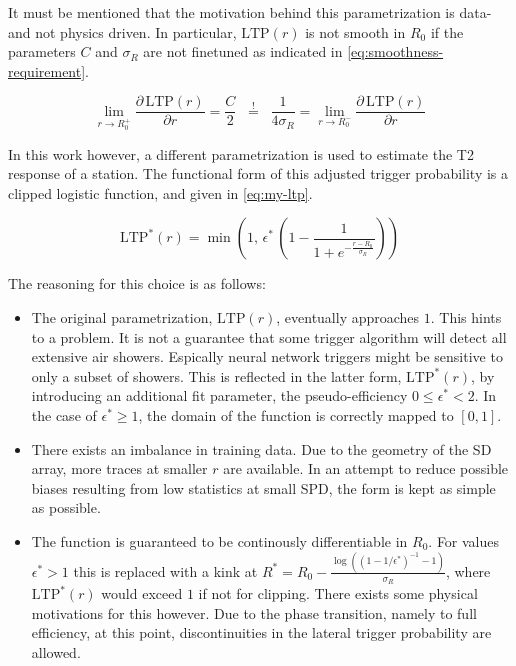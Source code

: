 It must be mentioned that the motivation behind this parametrization is data- and not physics driven. In particular, $\text{LTP}(r)$ is not smooth in $R_0$ if the 
parameters $C$ and $\sigma_R$ are not finetuned as indicated in \autoref{eq:smoothness-requirement}.

\begin{equation}
	\label{eq:smoothness-requirement}
	\lim\limits_{r \to R_0^+} \frac{\partial\,\text{LTP}(r)}{\partial r} = \frac{C}{2} \;\; \stackrel{!}{=} \;\; \frac{1}{4\sigma_R} = \lim\limits_{r \to R_0^-} \frac{\partial\,\text{LTP}(r)}{\partial r}
\end{equation}

In this work however, a different parametrization is used to estimate the T2 response of a station. The functional form of this adjusted trigger probability is
a clipped logistic function, and given in \autoref{eq:my-ltp}.

\begin{equation}
	\label{eq:my-ltp}
	\text{LTP}^*(r) = \min\left(1,\,\epsilon^*\,\left(1 - \frac{1}{1+e^{-\frac{r-R_0}{\sigma_R}}}\right)\right)
\end{equation}

The reasoning for this choice is as follows:

\begin{itemize}
	\item The original parametrization, $\text{LTP}(r)$, eventually approaches $1$. This hints to a problem. It is not a guarantee that some trigger algorithm will
	detect all extensive air showers. Espically neural network triggers  might be sensitive to only a subset of showers. This is reflected in the latter form, 
	$\text{LTP}^*(r)$, by introducing an additional fit parameter, the pseudo-efficiency $0\leq\epsilon^*<2$. In the case of $\epsilon^*\geq1$, the domain of the 
	function is correctly mapped to $[0, 1]$.

	\item There exists an imbalance in training data. Due to the geometry of the SD array, more traces at smaller $r$ are available. In an attempt to reduce 
	possible biases resulting from low statistics at small SPD, the form is kept as simple as possible.

	\item The function is guaranteed to be continously differentiable in $R_0$. For values $\epsilon^* > 1$ this is replaced with a kink at 
	$R^* = R_0 - \frac{\log\left(\left(1 - 1/\epsilon^*\right)^{-1}-1\right)}{\sigma_R}$, where $\text{LTP}^*(r)$ would exceed $1$ if not for clipping. There 
	exists some physical motivations for this however. Due to the phase transition, namely to full efficiency, at this point, discontinuities in the lateral 
	trigger probability are allowed.
\end{itemize}

